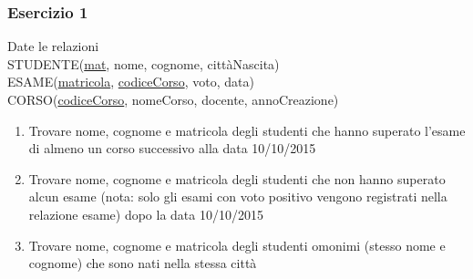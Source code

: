 \documentclass[a4paper]{article}
\begin{document}
\subsubsection{Esercizio 1}
Date le relazioni\medskip\\
STUDENTE(\underline{mat}, nome, cognome, cittàNascita)\\
ESAME(\underline{matricola}, \underline{codiceCorso}, voto, data)\\
CORSO(\underline{codiceCorso}, nomeCorso, docente, annoCreazione)

\begin{enumerate}
  \item Trovare nome, cognome e matricola degli studenti che hanno superato l'esame di almeno un corso successivo alla data 10/10/2015
  \item Trovare nome, cognome e matricola degli studenti che non hanno superato alcun esame (nota: solo gli esami con voto positivo vengono registrati nella relazione esame) dopo la data 10/10/2015
  \item Trovare nome, cognome e matricola degli studenti omonimi (stesso nome e cognome) che sono nati nella stessa città
\end{enumerate}
\end{document}

